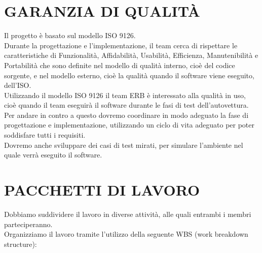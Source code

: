 \documentclass{report}
\begin{document}
\chapter{GARANZIA DI QUALITÀ}
Il progetto è basato sul modello ISO 9126.\\
Durante la progettazione e l'implementazione, il team cerca di rispettare le caratteristiche di Funzionalità, Affidabilità, Usabilità, Efficienza, Manutenibilità e Portabilità che sono definite nel modello di qualità interno, cioè del codice sorgente, e nel modello esterno, cioè la qualità quando il software viene eseguito, dell'ISO.\\
Utilizzando il modello ISO 9126 il team ERB è interessato alla qualità in uso, cioè quando il team eseguirà il software durante le fasi di test dell'autovettura.\\
Per andare in contro a questo dovremo coordinare in modo adeguato la fase di progettazione e implementazione, utilizzando un ciclo di vita adeguato per poter soddisfare tutti i requisiti.\\
Dovremo anche sviluppare dei casi di test mirati, per simulare l'ambiente nel quale verrà eseguito il software.


\chapter{PACCHETTI DI LAVORO}
Dobbiamo suddividere il lavoro in diverse attività, alle quali entrambi i membri parteciperanno.\\
Organizziamo il lavoro tramite l'utilizzo della seguente WBS (work breakdown structure):

\begin{figure}[hbt!]
  \noindent{}
\end{figure}
\end{document}
